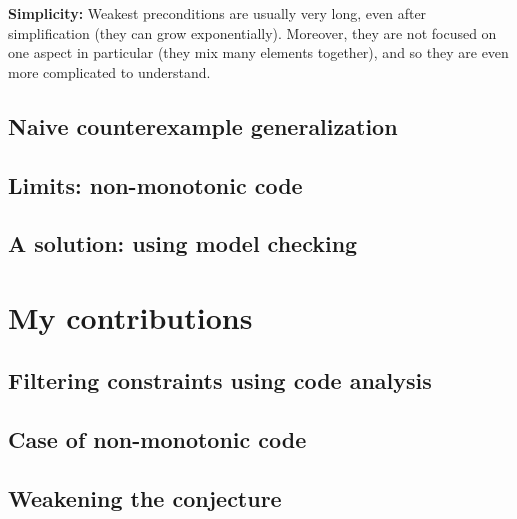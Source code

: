 \documentclass[11pt,a4paper,oldfontcommands]{memoir}
\begin{document}
    \textbf{Simplicity:} Weakest preconditions are usually very long, even after simplification (they can grow exponentially).
    Moreover, they are not focused on one aspect in particular (they mix many elements together), and so they are even more complicated
    to understand.

    \section{Naive counterexample generalization}

    \section{Limits: non-monotonic code}

    \section{A solution: using model checking}



\chapter{My contributions}


    \section{Filtering constraints using code analysis}


    \section{Case of non-monotonic code}

    \section{Weakening the conjecture}

\end{document}
